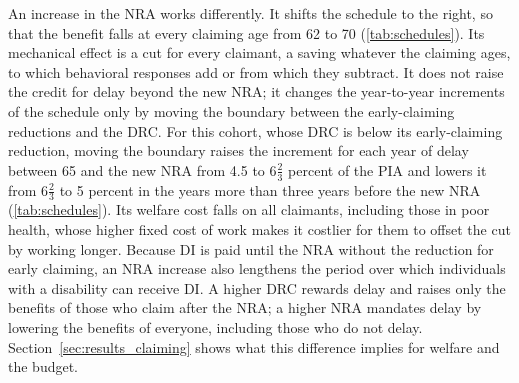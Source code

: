 An increase in the NRA works differently. It shifts the schedule to the right, so that the benefit falls at every claiming age from 62 to 70 (\autoref{tab:schedules}). Its mechanical effect is a cut for every claimant, a saving whatever the claiming ages, to which behavioral responses add or from which they subtract. It does not raise the credit for delay beyond the new NRA; it changes the year-to-year increments of the schedule only by moving the boundary between the early-claiming reductions and the DRC. For this cohort, whose DRC is below its early-claiming reduction, moving the boundary raises the increment for each year of delay between 65 and the new NRA from 4.5 to $6\tfrac{2}{3}$ percent of the PIA and lowers it from $6\tfrac{2}{3}$ to 5 percent in the years more than three years before the new NRA (\autoref{tab:schedules}). Its welfare cost falls on all claimants, including those in poor health, whose higher fixed cost of work makes it costlier for them to offset the cut by working longer. Because DI is paid until the NRA without the reduction for early claiming, an NRA increase also lengthens the period over which individuals with a disability can receive DI. A higher DRC rewards delay and raises only the benefits of those who claim after the NRA; a higher NRA mandates delay by lowering the benefits of everyone, including those who do not delay. Section~\ref{sec:results_claiming} shows what this difference implies for welfare and the budget.
